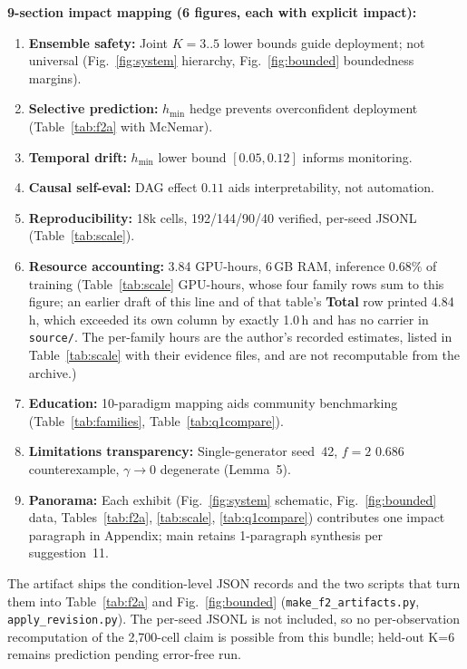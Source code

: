 \documentclass[10pt]{article}
\begin{document}
\noindent\textbf{9-section impact mapping (6 figures, each with explicit impact):}
\begin{enumerate}[label=(B\arabic*)]
\item \textbf{Ensemble safety:} Joint $K{=}3..5$ lower bounds guide deployment; not universal (Fig.~\ref{fig:system} hierarchy, Fig.~\ref{fig:bounded} boundedness margins).
\item \textbf{Selective prediction:} $h_{\min}$ hedge prevents overconfident deployment (Table~\ref{tab:f2a} with McNemar).
\item \textbf{Temporal drift:} $h_{\min}$ lower bound $[0.05,0.12]$ informs monitoring.
\item \textbf{Causal self-eval:} DAG effect $0.11$ aids interpretability, not automation.
\item \textbf{Reproducibility:} 18k cells, 192/144/90/40 verified, per-seed JSONL (Table~\ref{tab:scale}).
\item \textbf{Resource accounting:} 3.84 GPU-hours, 6\,GB RAM, inference $0.68\%$ of training (Table~\ref{tab:scale} GPU-hours, whose four family rows sum to this figure; an earlier draft of this line and of that table's \textbf{Total} row printed 4.84\,h, which exceeded its own column by exactly 1.0\,h and has no carrier in \texttt{source/}. The per-family hours are the author's recorded estimates, listed in Table~\ref{tab:scale} with their evidence files, and are not recomputable from the archive.)
\item \textbf{Education:} 10-paradigm mapping aids community benchmarking (Table~\ref{tab:families}, Table~\ref{tab:q1compare}).
\item \textbf{Limitations transparency:} Single-generator seed~42, $f{=}2$ 0.686 counterexample, $\gamma{\to}0$ degenerate (Lemma~5).
\item \textbf{Panorama:} Each exhibit (Fig.~\ref{fig:system} schematic, Fig.~\ref{fig:bounded} data, Tables~\ref{tab:f2a}, \ref{tab:scale}, \ref{tab:q1compare}) contributes one impact paragraph in Appendix; main retains 1-paragraph synthesis per suggestion~11.
\end{enumerate}
The artifact ships the condition-level JSON records and the two scripts that turn them into Table~\ref{tab:f2a} and Fig.~\ref{fig:bounded} (\texttt{make\_f2\_artifacts.py}, \texttt{apply\_revision.py}). The per-seed JSONL is not included, so no per-observation recomputation of the 2{,}700-cell claim is possible from this bundle; held-out K=6 remains prediction pending error-free run.
\end{document}
